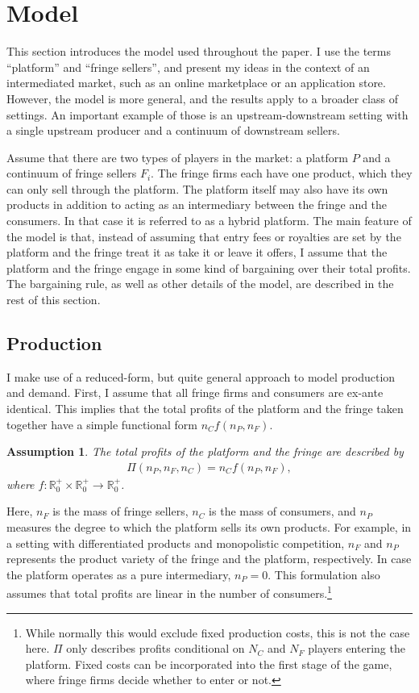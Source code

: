 \documentclass[a4paper]{article}
\newtheorem{assumption}{Assumption}
\begin{document}
\section{Model}
\label{sec:model}

This section introduces the model used throughout the paper.
I use the terms ``platform'' and ``fringe sellers'', and present my ideas in the context of an intermediated market, such as an online marketplace or an application store.
However, the model is more general, and the results apply to a broader class of settings.
An important example of those is an upstream-downstream setting with a single upstream producer and a continuum of downstream sellers.

Assume that there are two types of players in the market: a platform $P$ and a continuum of fringe sellers $F_i$.
The fringe firms each have one product, which they can only sell through the platform.
The platform itself may also have its own products in addition to acting as an intermediary between the fringe and the consumers.
In that case it is referred to as a hybrid platform.
The main feature of the model is that, instead of assuming that entry fees or royalties are set by the platform and the fringe treat it as take it or leave it offers, I assume that the platform and the fringe engage in some kind of bargaining over their total profits.
The bargaining rule, as well as other details of the model, are described in the rest of this section.


\subsection{Production}

I make use of a reduced-form, but quite general approach to model production and demand.
First, I assume that all fringe firms and consumers are ex-ante identical.
This implies that the total profits of the platform and the fringe taken together have a simple functional form $n_C f(n_P, n_F)$.
\begin{assumption}
    \label{ass:identical_fringe}
    The total profits of the platform and the fringe are described by 
    \begin{align*}
        \Pi(n_P, n_F, n_C) = n_C f(n_P, n_F),
    \end{align*}
    where $f: \mathbb{R}^+_0 \times \mathbb{R}^+_0 \to \mathbb{R}^+_0$.
\end{assumption}
Here, $n_F$ is the mass of fringe sellers, $n_C$ is the mass of consumers, and $n_P$ measures the degree to which the platform sells its own products.
For example, in a setting with differentiated products and monopolistic competition, $n_F$ and $n_P$ represents the product variety of the fringe and the platform, respectively.
In case the platform operates as a pure intermediary, $n_P = 0$.
This formulation also assumes that total profits are linear in the number of consumers.\footnote{
    While normally this would exclude fixed production costs, this is not the case here.
    $\Pi$ only describes profits conditional on $N_C$ and $N_F$ players entering the platform.
    Fixed costs can be incorporated into the first stage of the game, where fringe firms decide whether to enter or not.
}
\end{document}
